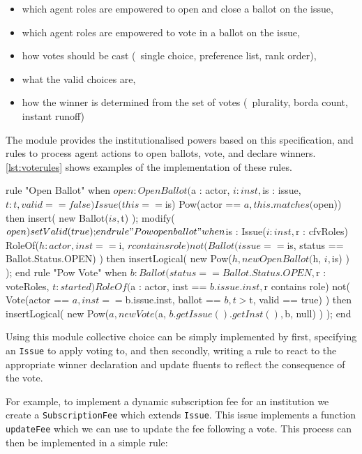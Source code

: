 \begin{itemize}
\item which agent roles are empowered to open and close a ballot on the issue,
\item which agent roles are empowered to vote in a ballot on the issue,
\item how votes should be cast (\eg\ single choice, preference list, rank order),
\item what the valid choices are,
\item how the winner is determined from the set of votes (\eg\ plurality, borda count, instant runoff)
\end{itemize}

The module provides the institutionalised powers based on this specification,
and rules to process agent actions to open ballots, vote, and declare winners.
\autoref{lst:voterules} shows examples of the implementation of these rules.

\begin{drools}[label=lst:voterules,caption={Opening of ballots and voting.}]
rule "Open Ballot"
	when
		$open : OpenBallot($a : actor, $i : inst, $is : issue, $t: t, valid == false)
		Issue(this == $is)
		Pow(actor == $a, this.matches($open))
	then
		insert( new Ballot($is, $t) );
		modify($open) {
			setValid(true);
		}
end
rule "Pow open ballot"
	when
		$is : Issue($i : inst, $r : cfvRoles)
		RoleOf($h : actor, inst == $i, $r contains role)
		not( Ballot(issue == $is, status == Ballot.Status.OPEN) )
	then
		insertLogical( new Pow($h, new OpenBallot($h, $i, $is) ) );
end
rule "Pow Vote"
	when
		$b : Ballot(status == Ballot.Status.OPEN, $r : voteRoles, $t : started)
		RoleOf($a : actor, inst == $b.issue.inst, $r contains role)
		not( Vote(actor == $a, inst == $b.issue.inst, ballot == $b, t > $t, valid == true) )
	then
		insertLogical( new Pow($a, new Vote($a, $b.getIssue().getInst(), $b, null) ) );
end
\end{drools}

Using this module collective choice can be simply implemented by first,
specifying an \texttt{Issue} to apply voting to, and then secondly, writing a
rule to react to the appropriate winner declaration and update fluents to
reflect the consequence of the vote.

For example, to implement a dynamic subscription fee for an institution we
create a \texttt{SubscriptionFee} which extends \texttt{Issue}. This issue
implements a function \texttt{updateFee} which we can use to update the fee
following a vote. This process can then be implemented in a simple rule:

